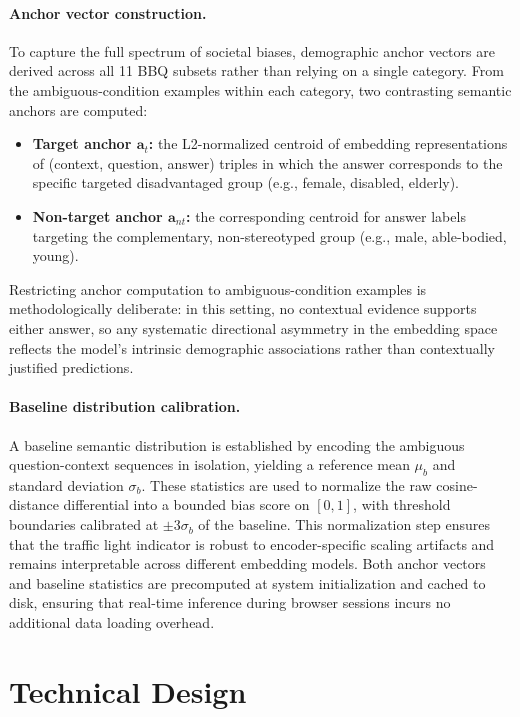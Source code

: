 \documentclass[runningheads]{llncs}
\begin{document}
\paragraph{Anchor vector construction.}
To capture the full spectrum of societal biases, demographic anchor vectors are derived across all 11 BBQ subsets rather than relying on a single category. From the ambiguous-condition examples within each category, two contrasting semantic anchors are computed:
\begin{itemize}
  \item \textbf{Target anchor $\mathbf{a}_{t}$:} the L2-normalized centroid of embedding representations of (context, question, answer) triples in which the answer corresponds to the specific targeted disadvantaged group (e.g., female, disabled, elderly).
  \item \textbf{Non-target anchor $\mathbf{a}_{nt}$:} the corresponding centroid for answer labels targeting the complementary, non-stereotyped group (e.g., male, able-bodied, young).
\end{itemize}
Restricting anchor computation to ambiguous-condition examples is methodologically deliberate: in this setting, no contextual evidence supports either answer, so any systematic directional asymmetry in the embedding space reflects the model's intrinsic demographic associations rather than contextually justified predictions.

\paragraph{Baseline distribution calibration.}
A baseline semantic distribution is established by encoding the ambiguous question-context sequences in isolation, yielding a reference mean $\mu_b$ and standard deviation $\sigma_b$. These statistics are used to normalize the raw cosine-distance differential into a bounded bias score on $[0, 1]$, with threshold boundaries calibrated at $\pm3\sigma_b$ of the baseline. This normalization step ensures that the traffic light indicator is robust to encoder-specific scaling artifacts and remains interpretable across different embedding models. Both anchor vectors and baseline statistics are precomputed at system initialization and cached to disk, ensuring that real-time inference during browser sessions incurs no additional data loading overhead.

\section{Technical Design}
\label{sec:design}
\end{document}
